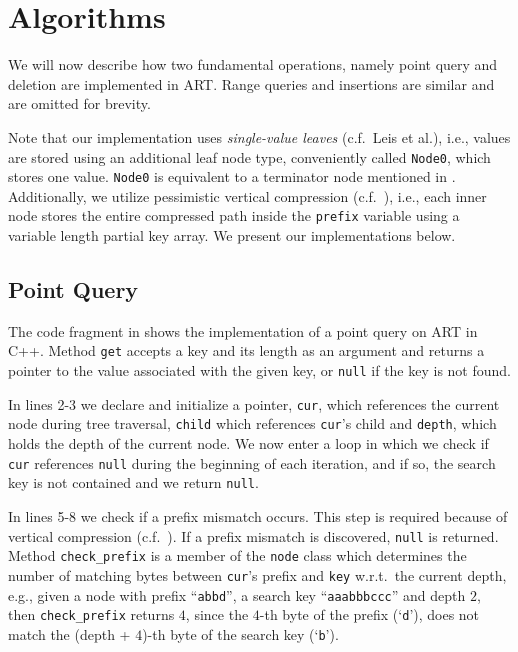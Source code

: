 \documentclass[abstracton,12pt]{scrartcl}
\theoremstyle{definition}
\begin{document}
\newpage

\section{Algorithms}\label{sec:algorithms}

\vspace{-2mm}
We will now describe how two fundamental operations, namely
point query and deletion are implemented in ART.
Range queries and insertions are similar and are omitted for brevity.

Note that our implementation uses
\textit{single-value leaves} (c.f.\ Leis et al.), 
i.e., values are stored using an additional leaf node type, conveniently
called \texttt{Node0}, which stores one value. \texttt{Node0} is equivalent to
a terminator node mentioned in . Additionally, we utilize
pessimistic vertical compression (c.f.\ ),
i.e., each inner node stores the entire compressed path inside the 
\texttt{prefix} variable using a variable length partial key array. 
We present our implementations below.

\vspace{-4mm}
\subsection{Point Query}\label{sec:point-query}

\vspace{-1mm}
The code fragment in  shows the implementation of a 
point query on ART in C++. Method \texttt{get} accepts a key and its length
as an argument and returns a pointer to the value associated with the given 
key, or \texttt{null} if the key is not found.

In lines 2-3 we declare and initialize a pointer, \texttt{cur}, which references
the current node during tree traversal, \texttt{child} which references 
\texttt{cur}'s child and \texttt{depth}, which holds the depth
of the current node. We now enter a loop in which we check if \texttt{cur} 
references \texttt{null} during the beginning of each iteration, and if so, 
the search key is not contained and we return \texttt{null}.

In lines 5-8 we check if a prefix mismatch occurs. This step is required
because of vertical compression (c.f.\ ).
If a prefix mismatch is discovered, \texttt{null} is returned. Method 
\texttt{check\_prefix} is a member of the \texttt{node} class which
determines the number of matching bytes between \texttt{cur}'s prefix
and \texttt{key} w.r.t.\ the current depth, e.g., given a node with prefix
``\texttt{abbd}'', a search key ``\texttt{aaabbbccc}'' and depth $2$, then
\texttt{check\_prefix} returns $4$, since the $4$-th byte of the prefix
(`\texttt{d}'), does not match the (depth + $4$)-th byte of the search key
(`\texttt{b}').
\end{document}

